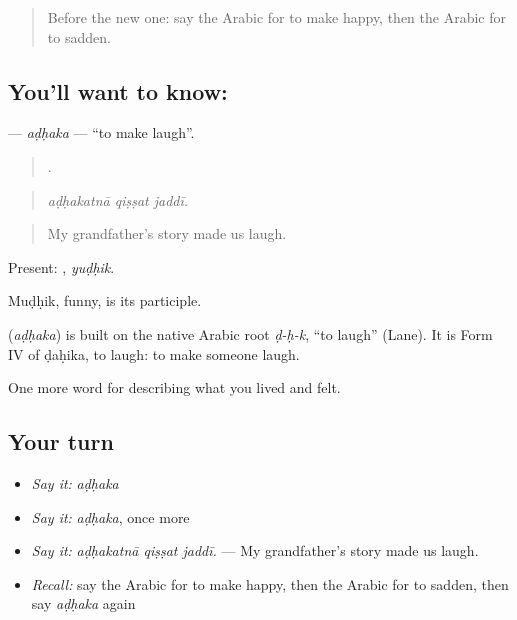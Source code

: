 \label{lesson:AR-C498-adhaka}



\begin{quote}
Before the new one: say the Arabic for to make happy, then the Arabic for to sadden.
\end{quote}

\subsection*{You'll want to know: }
\textbf{} — \emph{aḍḥaka} — \textquotedblleft{}to make laugh\textquotedblright{}.

\begin{quote}
  .
\end{quote}

\begin{quote}
\emph{aḍḥakatnā qiṣṣat jaddī.}
\end{quote}

\begin{quote}
My grandfather's story made us laugh.
\end{quote}

Present: , \emph{yuḍḥik}.

Muḍḥik, funny, is its participle.

\begin{cousinweb}
\textbf{} (\emph{aḍḥaka}) is built on the native Arabic root \emph{ḍ-ḥ-k}, \textquotedblleft{}to laugh\textquotedblright{} (Lane). It is Form IV of ḍaḥika, to laugh: to make someone laugh.
\end{cousinweb}

\begin{grammarlens}[title={What you've built}]
One more word for describing what you lived and felt.
\end{grammarlens}

\subsection*{Your turn}
\begin{itemize}
\raggedright
  \item \emph{Say it:} \emph{aḍḥaka}
  \item \emph{Say it:} \emph{aḍḥaka}, once more
  \item \emph{Say it:} \emph{aḍḥakatnā qiṣṣat jaddī.} — My grandfather's story made us laugh.
  \item \emph{Recall:} say the Arabic for to make happy, then the Arabic for to sadden, then say \emph{aḍḥaka} again
\end{itemize}


